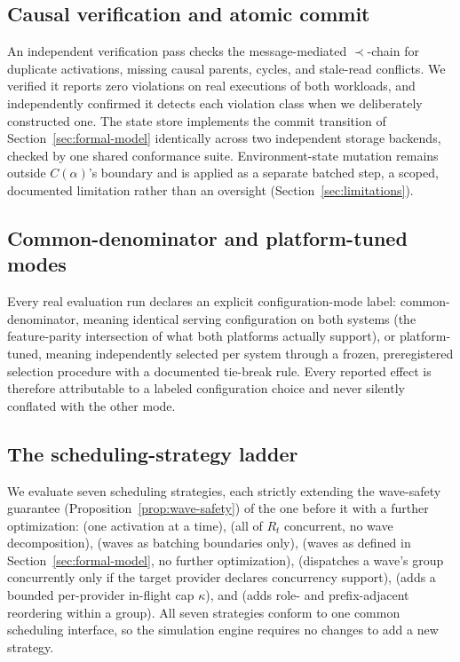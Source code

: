 \subsection{Causal verification and atomic commit}
\label{sec:causal-verification}

An independent verification pass checks the message-mediated $\prec$-chain for duplicate activations, missing causal parents, cycles, and stale-read conflicts. We verified it reports zero violations on real executions of both workloads, and independently confirmed it detects each violation class when we deliberately constructed one. The state store implements the commit transition of Section~\ref{sec:formal-model} identically across two independent storage backends, checked by one shared conformance suite. Environment-state mutation remains outside $C(\alpha)$'s boundary and is applied as a separate batched step, a scoped, documented limitation rather than an oversight (Section~\ref{sec:limitations}).

\subsection{Common-denominator and platform-tuned modes}
\label{sec:config-modes}

Every real evaluation run declares an explicit configuration-mode label: common-denominator, meaning identical serving configuration on both systems (the feature-parity intersection of what both platforms actually support), or platform-tuned, meaning independently selected per system through a frozen, preregistered selection procedure with a documented tie-break rule. Every reported effect is therefore attributable to a labeled configuration choice and never silently conflated with the other mode.

\subsection{The scheduling-strategy ladder}
\label{sec:ladder}

We evaluate seven scheduling strategies, each strictly extending the wave-safety guarantee (Proposition~\ref{prop:wave-safety}) of the one before it with a further optimization: \Sequential{} (one activation at a time), \NaiveConcurrent{} (all of $R_t$ concurrent, no wave decomposition), \Barrier{} (waves as batching boundaries only), \CausalOnly{} (waves as defined in Section~\ref{sec:formal-model}, no further optimization), \CapabilityAware{} (dispatches a wave's group concurrently only if the target provider declares concurrency support), \QueueAware{} (adds a bounded per-provider in-flight cap $\kappa$), and \Full{} (adds role- and prefix-adjacent reordering within a group). All seven strategies conform to one common scheduling interface, so the simulation engine requires no changes to add a new strategy.

